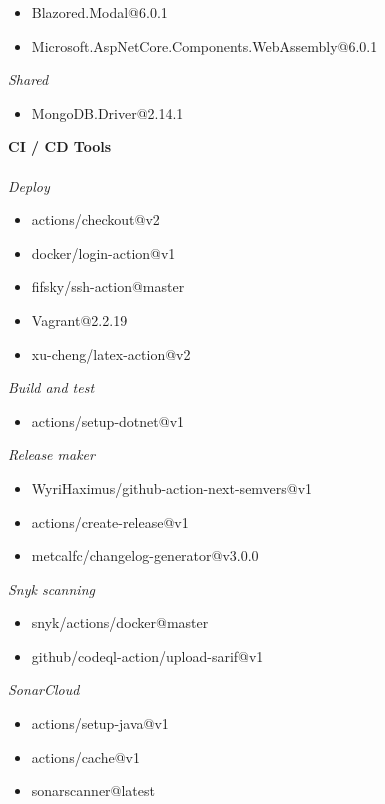 \begin{enumerate}
\begin{itemize}
        \item Blazored.Modal@6.0.1
        \item Microsoft.AspNetCore.Components.WebAssembly@6.0.1
    \end{itemize}
    \textit{Shared}
    \begin{itemize}
        \item MongoDB.Driver@2.14.1
    \end{itemize}
    \textbf{CI / CD Tools}\\\\
    \textit{Deploy}
    \begin{itemize}
         \item actions/checkout@v2
         \item docker/login-action@v1
         \item fifsky/ssh-action@master
         \item Vagrant@2.2.19
         \item xu-cheng/latex-action@v2
    \end{itemize}
      
    \textit{Build and test}
    \begin{itemize}
         \item actions/setup-dotnet@v1
    \end{itemize}
    
    \textit{Release maker}
    \begin{itemize}
         \item WyriHaximus/github-action-next-semvers@v1
         \item actions/create-release@v1
         \item metcalfc/changelog-generator@v3.0.0
    \end{itemize}
    
    \textit{Snyk scanning}
    \begin{itemize}
         \item snyk/actions/docker@master
         \item github/codeql-action/upload-sarif@v1
    \end{itemize}
    
    \textit{SonarCloud}
    \begin{itemize}
        \item actions/setup-java@v1
        \item actions/cache@v1
        \item sonarscanner@latest
    \end{itemize}
    

\end{enumerate}
